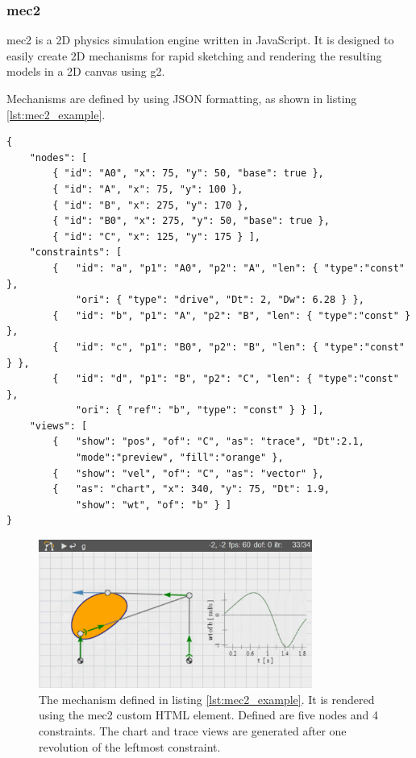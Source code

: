 \subsubsection{mec2}

mec2 is a 2D physics simulation engine written in JavaScript.
It is designed to easily create 2D mechanisms for rapid sketching and rendering the resulting models in a 2D canvas using g2.

Mechanisms are defined by using JSON formatting, as shown in listing \ref{lst:mec2_example}.

\begin{lstlisting}[label={lst:mec2_example}, caption={ Example for a mechanism defined in the syntax proposed by \name{mec2}. }]
{
    "nodes": [
        { "id": "A0", "x": 75, "y": 50, "base": true },
        { "id": "A", "x": 75, "y": 100 },
        { "id": "B", "x": 275, "y": 170 },
        { "id": "B0", "x": 275, "y": 50, "base": true },
        { "id": "C", "x": 125, "y": 175 } ],
    "constraints": [
        {   "id": "a", "p1": "A0", "p2": "A", "len": { "type":"const" },
            "ori": { "type": "drive", "Dt": 2, "Dw": 6.28 } },
        {   "id": "b", "p1": "A", "p2": "B", "len": { "type":"const" } },
        {   "id": "c", "p1": "B0", "p2": "B", "len": { "type":"const" } },
        {   "id": "d", "p1": "B", "p2": "C", "len": { "type":"const" },
            "ori": { "ref": "b", "type": "const" } } ],
    "views": [
        {   "show": "pos", "of": "C", "as": "trace", "Dt":2.1,
            "mode":"preview", "fill":"orange" },
        {   "show": "vel", "of": "C", "as": "vector" },
        {   "as": "chart", "x": 340, "y": 75, "Dt": 1.9,
            "show": "wt", "of": "b" } ]
}
\end{lstlisting}

\begin{figure}
    \centering
    \includegraphics[width=0.8\textwidth]{images/mec2_chart.png}
    \caption[Example of the mec2 HTML element]{ The mechanism defined in listing \ref{lst:mec2_example}. It is rendered using the mec2 custom HTML element. Defined are five nodes and 4 constraints. The chart and trace views are generated after one revolution of the leftmost constraint. }
    \label{fig:generated_data_samples}
\end{figure}

